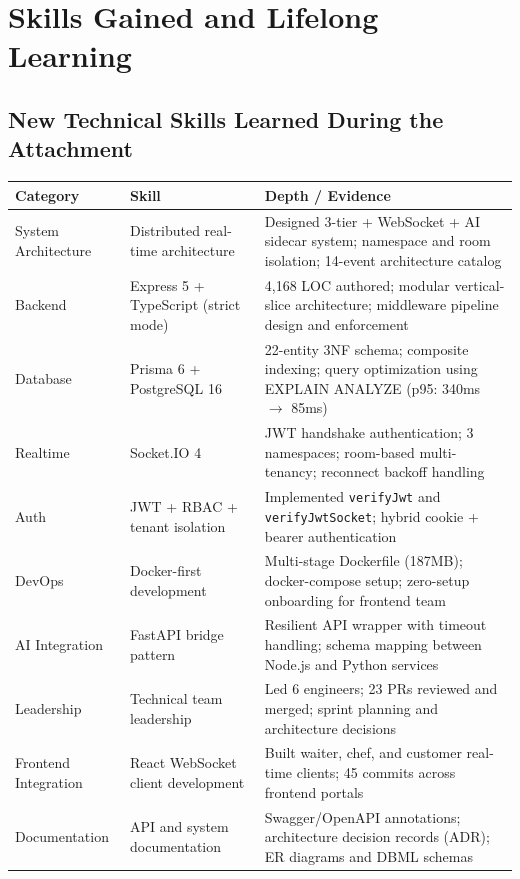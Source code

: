 \chapter{Skills Gained and Lifelong Learning}
\label{ch:skills_ch8}

\section{New Technical Skills Learned During the Attachment}

\begin{center}
\label{tab:skills_ch8}
\small
\begin{xltabular}{\textwidth}{@{}p{0.26\textwidth}p{0.30\textwidth}X@{}}
\toprule
\textbf{Category} & \textbf{Skill} & \textbf{Depth / Evidence} \\
\midrule

System Architecture &
Distributed real-time architecture &
Designed 3-tier + WebSocket + AI sidecar system; namespace and room isolation; 14-event architecture catalog \\

Backend &
Express 5 + TypeScript (strict mode) &
4,168 LOC authored; modular vertical-slice architecture; middleware pipeline design and enforcement \\

Database &
Prisma 6 + PostgreSQL 16 &
22-entity 3NF schema; composite indexing; query optimization using EXPLAIN ANALYZE (p95: 340ms $\rightarrow$ 85ms) \\

Realtime &
Socket.IO 4 &
JWT handshake authentication; 3 namespaces; room-based multi-tenancy; reconnect backoff handling \\

Auth &
JWT + RBAC + tenant isolation &
Implemented \texttt{verifyJwt} and \texttt{verifyJwtSocket}; hybrid cookie + bearer authentication \\

DevOps &
Docker-first development &
Multi-stage Dockerfile (187MB); docker-compose setup; zero-setup onboarding for frontend team \\

AI Integration &
FastAPI bridge pattern &
Resilient API wrapper with timeout handling; schema mapping between Node.js and Python services \\

Leadership &
Technical team leadership &
Led 6 engineers; 23 PRs reviewed and merged; sprint planning and architecture decisions \\

Frontend Integration &
React WebSocket client development &
Built waiter, chef, and customer real-time clients; 45 commits across frontend portals \\

Documentation &
API and system documentation &
Swagger/OpenAPI annotations; architecture decision records (ADR); ER diagrams and DBML schemas \\

\bottomrule
\end{xltabular}
\end{center}

